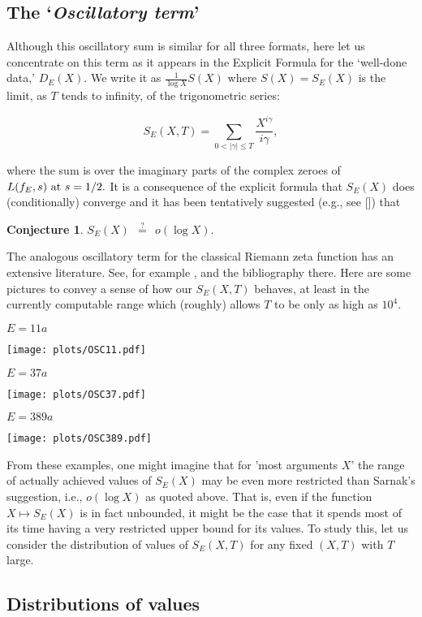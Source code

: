 \documentclass[11pt]{article}
\theoremstyle{plain}
\newtheorem{conjecture}[theorem]{Conjecture}
\theoremstyle{definition}
\numberwithin{equation}{section}
\numberwithin{figure}{section}
\numberwithin{table}{section}
\begin{document}
 \subsection{The `{\it Oscillatory term}'}\label{osc}
  Although this oscillatory sum is similar for all three formats, here let us concentrate on this term as it appears in the Explicit Formula for the `well-done data,'  $D_E(X)$. We write it as  ${\frac{1}{\log X}}S(X)$ where $S(X)=S_E(X)$ is the limit, as $T$ tends to infinity, of the trigonometric series:

  $$S_E(X,T) = \sum_{0<|\gamma| \le T}{\frac{X^{i\gamma}}{i\gamma}},$$

  where the sum is over the imaginary parts of the complex zeroes of  $L(f_E, s)\ {\rm at}\ s=1/2.$   It is a consequence of the explicit formula that $S_E(X)$ does (conditionally) converge and it has been tentatively suggested  (e.g., see [{\cite{S}}]) that

  \begin{conjecture}  $ S_E(X)\ \  {\stackrel{?}{=}}\ \  o(\log X).$\end{conjecture}   The analogous oscillatory term for the classical Riemann zeta function  has an extensive literature. See, for example \cite{G}, \cite{Fu} and the bibliography there. Here are some pictures to convey a sense of how our $S_E(X,T)$ behaves, at least in the currently computable range which (roughly) allows $T$ to be only as high as  $10^4$.

  \newpage
  \centerline{ $E = 11a$}
 \vskip10pt
  \texttt{[image: plots/OSC11.pdf]}

  \centerline{ $E = 37a$}
  \texttt{[image: plots/OSC37.pdf]}
   \vskip20pt
  \centerline{ $E = 389a$}
\vskip20pt
  \texttt{[image: plots/OSC389.pdf]}

 From these examples, one might imagine that for 'most arguments $X$' the range of actually achieved values of $S_E(X)$  may be even more restricted than Sarnak's suggestion, i.e., $o(\log X)$ as quoted above. That is, even if  the function $X \mapsto S_E(X)$ is in fact unbounded, it might be the case that it spends most of its time having a very restricted upper bound for its values.  To study this, let us consider the distribution of values of $S_E(X,T)$ for any fixed $(X,T)$ with $T$ large.


\subsection{Distributions of values }
\end{document}
